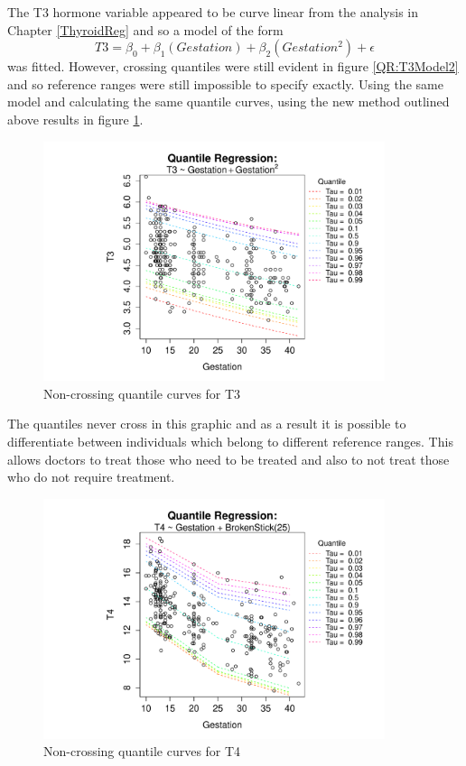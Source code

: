 \documentclass[12pt,a4paper]{report}
\begin{document}
The T3 hormone variable appeared to be curve linear from the analysis in Chapter \ref{ThyroidReg} and so a model of the form
$$T3=\beta_{0}+\beta_{1}(Gestation)+\beta_{2}(Gestation^{2})+\epsilon$$
was fitted. However, crossing quantiles were still evident in figure \ref{QR:T3Model2} and so reference ranges were still impossible to specify exactly. Using the same model and calculating the same quantile curves, using the new method outlined above results in figure \ref{NCQR:T3}.
\vspace{2mm}
\begin{figure}[ht]\centering
    \includegraphics[width=10cm]{QRT3NCModel.pdf}
    \caption{Non-crossing quantile curves for T3}
    \label{NCQR:T3}
\end{figure}
\vspace{2mm}
The quantiles never cross in this graphic and as a result it is possible to differentiate between individuals which belong to different reference ranges. This allows doctors to treat those who need to be treated and also to not treat those who do not require treatment.
\vspace{2mm}

\begin{figure}[ht]\centering
    \includegraphics[width=10cm]{QRT4NCModel.pdf}
    \caption{Non-crossing quantile curves for T4}
    \label{NCQR:T4}
\end{figure}
\vspace{2mm}
\end{document}
